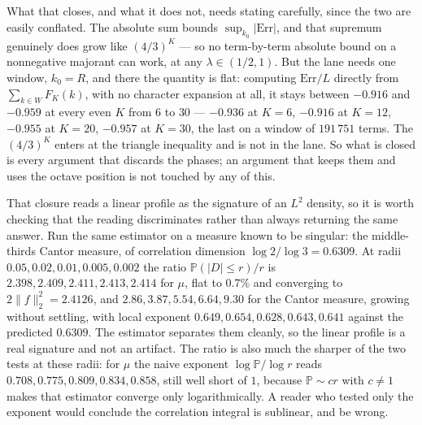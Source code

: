 \documentclass[11pt]{article}
\theoremstyle{remark}
\newcommand{\lam}{\lambda}
\begin{document}
\begin{sloppypar}
What that closes, and what it does not, needs stating carefully, since the two are easily conflated.
The absolute sum bounds $\sup_{k_0}|\mathrm{Err}|$, and that supremum genuinely does grow
like $(4/3)^K$ --- so no term-by-term absolute bound on a nonnegative majorant can work, at any
$\lam\in(1/2,1)$. But the lane needs one window, $k_0=R$, and there the quantity is flat: computing
$\mathrm{Err}/L$ directly from $\sum_{k\in W}F_K(k)$, with no character expansion at all, it stays
between $-0.916$ and $-0.959$ at every even $K$ from $6$ to $30$ --- $-0.936$ at $K=6$, $-0.916$ at
$K=12$, $-0.955$ at $K=20$, $-0.957$ at $K=30$, the last on a window of $191\,751$ terms. The $(4/3)^K$ enters at the triangle
inequality and is not in the lane. So what is closed is every argument that discards the phases; an
argument that keeps them and uses the octave position is not touched by any of this.
\end{sloppypar}

That closure reads a linear profile as the signature of an $L^2$ density, so it is worth checking that
the reading discriminates rather than always returning the same answer. Run the same estimator on a
measure known to be singular: the middle-thirds Cantor measure, of correlation dimension
$\log2/\log3=0.6309$. At radii $0.05,0.02,0.01,0.005,0.002$ the ratio $\mathbb P(|D|\le r)/r$ is
$2.398,2.409,2.411,2.413,2.414$ for $\mu$, flat to $0.7\%$ and converging to $2\|f\|_2^2=2.4126$, and
$2.86,3.87,5.54,6.64,9.30$ for the Cantor measure, growing without settling, with local exponent
$0.649,0.654,0.628,0.643,0.641$ against the predicted $0.6309$. The estimator separates them cleanly,
so the linear profile is a real signature and not an artifact. The ratio is also much the sharper of
the two tests at these radii: for $\mu$ the naive exponent $\log\mathbb P/\log r$ reads
$0.708,0.775,0.809,0.834,0.858$, still well short of $1$, because $\mathbb P\sim cr$ with $c\ne1$ makes
that estimator converge only logarithmically. A reader who tested only the exponent would conclude the
correlation integral is sublinear, and be wrong.
\end{document}
